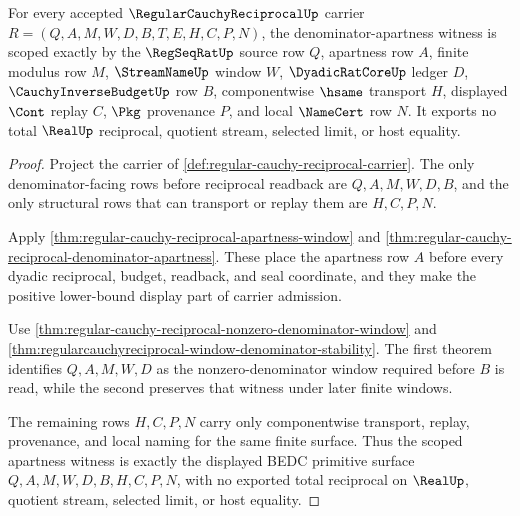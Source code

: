 \begin{theorem}
\label{thm:regular-cauchy-reciprocal-scoped-denominator-apartness}
For every accepted $\RegularCauchyReciprocalUp$ carrier $R=(Q,A,M,W,D,B,T,E,H,C,P,N)$, the denominator-apartness witness is scoped exactly by the $\RegSeqRatUp$ source row $Q$, apartness row $A$, finite modulus row $M$, $\StreamNameUp$ window $W$, $\DyadicRatCoreUp$ ledger $D$, $\CauchyInverseBudgetUp$ row $B$, componentwise $\hsame$ transport $H$, displayed $\Cont$ replay $C$, $\Pkg$ provenance $P$, and local $\NameCert$ row $N$. It exports no total $\RealUp$ reciprocal, quotient stream, selected limit, or host equality.
\end{theorem}
\begin{proof}
Project the carrier of \autoref{def:regular-cauchy-reciprocal-carrier}. The only denominator-facing rows before reciprocal readback are $Q,A,M,W,D,B$, and the only structural rows that can transport or replay them are $H,C,P,N$.

Apply \autoref{thm:regular-cauchy-reciprocal-apartness-window} and \autoref{thm:regular-cauchy-reciprocal-denominator-apartness}. These place the apartness row $A$ before every dyadic reciprocal, budget, readback, and seal coordinate, and they make the positive lower-bound display part of carrier admission.

Use \autoref{thm:regular-cauchy-reciprocal-nonzero-denominator-window} and \autoref{thm:regularcauchyreciprocal-window-denominator-stability}. The first theorem identifies $Q,A,M,W,D$ as the nonzero-denominator window required before $B$ is read, while the second preserves that witness under later finite windows.

The remaining rows $H,C,P,N$ carry only componentwise transport, replay, provenance, and local naming for the same finite surface. Thus the scoped apartness witness is exactly the displayed BEDC primitive surface $Q,A,M,W,D,B,H,C,P,N$, with no exported total reciprocal on $\RealUp$, quotient stream, selected limit, or host equality.
\end{proof}

